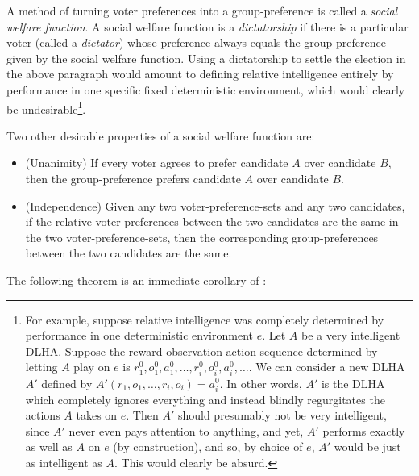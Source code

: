 \documentclass[twoside,11pt]{article}
\begin{document}
A method of turning voter preferences into a group-preference is
called a \emph{social welfare function}.
A social welfare function is a \emph{dictatorship} if there is a particular voter
(called a \emph{dictator}) whose preference
always equals the group-preference given by the social welfare function.
Using a dictatorship to settle the election in
the above paragraph would amount to defining relative intelligence entirely by performance
in one specific fixed deterministic environment,
which would clearly be undesirable\footnote{For example,
suppose relative intelligence was completely determined by performance
in one deterministic environment $e$. Let $A$ be a very intelligent DLHA. Suppose the
reward-observation-action sequence determined by letting $A$ play on $e$
is $r^0_1,o^0_1,a^0_1,\ldots,r^0_i,o^0_i,a^0_i,\ldots$.
We can consider a new DLHA $A'$ defined by $A'(r_1,o_1,\ldots,r_i,o_i)=a^0_i$.
In other words, $A'$ is the DLHA which completely ignores everything
and instead blindly regurgitates the actions $A$ takes on $e$. Then $A'$ should
presumably not be very intelligent, since $A'$ never even pays attention to anything,
and yet, $A'$ performs exactly as well as $A$ on
$e$ (by construction), and so, by choice of $e$, $A'$ would be just as intelligent as $A$.
This would clearly be absurd.}.

Two other desirable properties of a social welfare function are:
\begin{itemize}
    \item
    (Unanimity)
    If every voter agrees to prefer candidate $A$ over candidate $B$, then
    the group-preference prefers candidate $A$ over candidate $B$.
    \item
    (Independence)
    Given any two voter-preference-sets and any
    two candidates, if the relative voter-preferences
    between the two candidates are the same in the two voter-preference-sets, then the
    corresponding group-preferences between the two candidates are the same.
\end{itemize}
The following theorem is an immediate corollary of \citet{kirman}:
\end{document}
